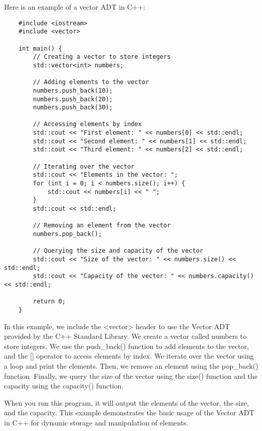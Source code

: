 \begin{solution}
    Here is an example of a vector ADT in C++: \\
    \horizontalline
    \begin{verbatim}
    #include <iostream>
    #include <vector>
    
    int main() {
        // Creating a vector to store integers
        std::vector<int> numbers;
    
        // Adding elements to the vector
        numbers.push_back(10);
        numbers.push_back(20);
        numbers.push_back(30);
    
        // Accessing elements by index
        std::cout << "First element: " << numbers[0] << std::endl;
        std::cout << "Second element: " << numbers[1] << std::endl;
        std::cout << "Third element: " << numbers[2] << std::endl;
    
        // Iterating over the vector
        std::cout << "Elements in the vector: ";
        for (int i = 0; i < numbers.size(); i++) {
            std::cout << numbers[i] << " ";
        }
        std::cout << std::endl;
    
        // Removing an element from the vector
        numbers.pop_back();
    
        // Querying the size and capacity of the vector
        std::cout << "Size of the vector: " << numbers.size() << std::endl;
        std::cout << "Capacity of the vector: " << numbers.capacity() << std::endl;
    
        return 0;
    }
    \end{verbatim}
    
    \horizontalline

    In this example, we include the <vector> header to use the Vector ADT provided by the C++ Standard Library. We create a vector called numbers to store integers. We use the push\_back() function to add elements to the vector, and the [] operator to access elements by index. We iterate over the vector using a loop and print the 
    elements. Then, we remove an element using the pop\_back() function. Finally, we query the size of the vector using the size() function and the capacity using the capacity() function.

    \noindent When you run this program, it will output the elements of the vector, the size, and the capacity. This example demonstrates the basic usage of the Vector ADT in C++ for dynamic storage and manipulation of elements.
\end{solution}

